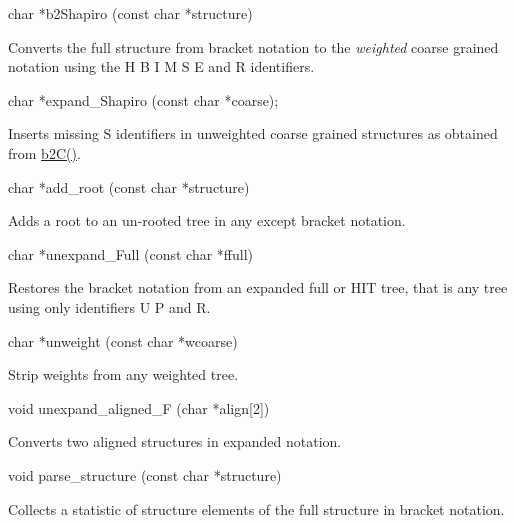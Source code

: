 \begin{DoxyVerb}char *b2Shapiro (const char *structure)
\end{DoxyVerb}
 Converts the full structure from bracket notation to the {\itshape weighted} coarse grained notation using the \textquotesingle{}H\textquotesingle{} \textquotesingle{}B\textquotesingle{} \textquotesingle{}I\textquotesingle{} \textquotesingle{}M\textquotesingle{} \textquotesingle{}S\textquotesingle{} \textquotesingle{}E\textquotesingle{} and \textquotesingle{}R\textquotesingle{} identifiers.

\begin{DoxyVerb}char  *expand_Shapiro (const char *coarse);
\end{DoxyVerb}
 Inserts missing \textquotesingle{}S\textquotesingle{} identifiers in unweighted coarse grained structures as obtained from \mbox{\hyperlink{group__struct__utils__deprecated_ga9c80d92391f2833549a8b6dac92233f0}{b2\+C()}}.

\begin{DoxyVerb}char *add_root (const char *structure)
\end{DoxyVerb}
 Adds a root to an un-\/rooted tree in any except bracket notation.

\begin{DoxyVerb}char  *unexpand_Full (const char *ffull)
\end{DoxyVerb}
 Restores the bracket notation from an expanded full or H\+IT tree, that is any tree using only identifiers \textquotesingle{}U\textquotesingle{} \textquotesingle{}P\textquotesingle{} and \textquotesingle{}R\textquotesingle{}.

\begin{DoxyVerb}char  *unweight (const char *wcoarse)
\end{DoxyVerb}
 Strip weights from any weighted tree.

\begin{DoxyVerb}void   unexpand_aligned_F (char *align[2])
\end{DoxyVerb}
 Converts two aligned structures in expanded notation.

\begin{DoxyVerb}void   parse_structure (const char *structure)
\end{DoxyVerb}
 Collects a statistic of structure elements of the full structure in bracket notation.

